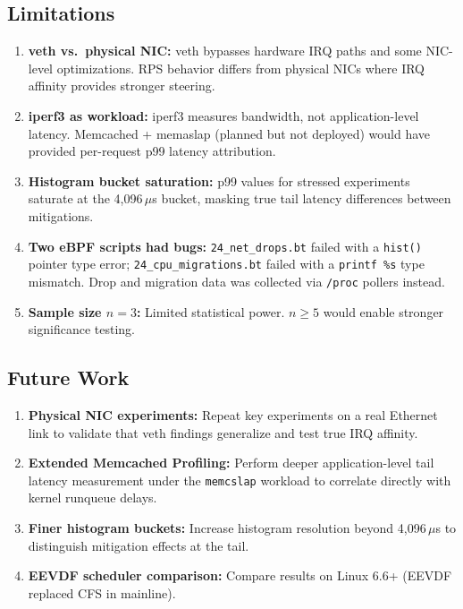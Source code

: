 \documentclass[11pt,a4paper]{article}
\begin{document}
\subsection{Limitations}

\begin{enumerate}[leftmargin=*]
  \item \textbf{veth vs.\ physical NIC:} veth bypasses hardware IRQ paths and some NIC-level optimizations. RPS behavior differs from physical NICs where IRQ affinity provides stronger steering.

  \item \textbf{iperf3 as workload:} iperf3 measures bandwidth, not application-level latency. Memcached + memaslap (planned but not deployed) would have provided per-request p99 latency attribution.

  \item \textbf{Histogram bucket saturation:} p99 values for stressed experiments saturate at the 4,096\,$\mu$s bucket, masking true tail latency differences between mitigations.

  \item \textbf{Two eBPF scripts had bugs:} \texttt{24\_net\_drops.bt} failed with a \texttt{hist()} pointer type error; \texttt{24\_cpu\_migrations.bt} failed with a \texttt{printf \%s} type mismatch. Drop and migration data was collected via \texttt{/proc} pollers instead.

  \item \textbf{Sample size $n=3$:} Limited statistical power. $n \geq 5$ would enable stronger significance testing.
\end{enumerate}

\subsection{Future Work}

\begin{enumerate}[leftmargin=*]
  \item \textbf{Physical NIC experiments:} Repeat key experiments on a real Ethernet link to validate that veth findings generalize and test true IRQ affinity.
  \item \textbf{Extended Memcached Profiling:} Perform deeper application-level tail latency measurement under the \texttt{memcslap} workload to correlate directly with kernel runqueue delays.
  \item \textbf{Finer histogram buckets:} Increase histogram resolution beyond 4,096\,$\mu$s to distinguish mitigation effects at the tail.
  \item \textbf{EEVDF scheduler comparison:} Compare results on Linux 6.6+ (EEVDF replaced CFS in mainline).
\end{enumerate}
\end{document}
